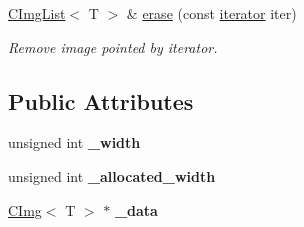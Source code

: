 \begin{Indent}
\begin{DoxyCompactItemize}
\hyperlink{structcimg__library__suffixed_1_1CImgList}{C\+Img\+List}$<$ T $>$ \& \hyperlink{structcimg__library__suffixed_1_1CImgList_afe6ef571f05f34f26f73eb02c9464d07}{erase} (const \hyperlink{structcimg__library__suffixed_1_1CImgList_a9d3e27da63f536e04fc7249f8e13dba0}{iterator} iter)
\begin{DoxyCompactList}\small\item\em Remove image pointed by iterator. \end{DoxyCompactList}\end{DoxyCompactItemize}
\end{Indent}
\subsection*{Public Attributes}
\begin{DoxyCompactItemize}
\item 
\mbox{\label{structcimg__library__suffixed_1_1CImgList_a6f9bc43113f7f386e9b1396b2889c5d3}} 
unsigned int {\bfseries \+\_\+width}
\item 
\mbox{\label{structcimg__library__suffixed_1_1CImgList_ac8e0786da3407973bc1284b7195c6d55}} 
unsigned int {\bfseries \+\_\+allocated\+\_\+width}
\item 
\mbox{\label{structcimg__library__suffixed_1_1CImgList_a9ef8a2d3cfb63e192fe80dd8ba6690f1}} 
\hyperlink{structcimg__library__suffixed_1_1CImg}{C\+Img}$<$ T $>$ $\ast$ {\bfseries \+\_\+data}
\end{DoxyCompactItemize}
